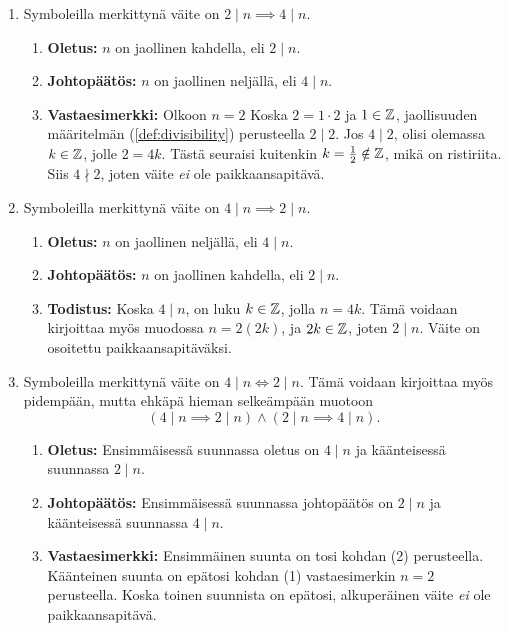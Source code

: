 \documentclass[12pt,a4paper]{article}
\begin{document}
\begin{solution}
  \leavevmode\par
  \begin{enumerate}[label=(\arabic*), nosep]
    \item Symboleilla merkittynä väite on \(2 \mid n \implies 4 \mid n\).
    \begin{enumerate}[label=\alph*), nosep]
      \item \textbf{Oletus:} \(n\) on jaollinen kahdella, eli \(2 \mid n\).
      \item \textbf{Johtopäätös:} \(n\) on jaollinen neljällä, eli \(4 \mid n\).
      \item \textbf{Vastaesimerkki:} Olkoon \(n = 2\) Koska \(2 = 1\cdot 2\) ja
        \(1 \in \mathbb{Z}\), jaollisuuden määritelmän (\ref{def:divisibility})
        perusteella \(2 \mid 2\). Jos \(4 \mid 2\), olisi olemassa
        \(k \in \mathbb{Z}\), jolle \(2 = 4k\). Tästä seuraisi kuitenkin
        \(k = \frac{1}{2} \notin \mathbb{Z}\), mikä on ristiriita. Siis \(4 \nmid 2\),
        joten väite \emph{ei} ole paikkaansapitävä.
    \end{enumerate}
  \item Symboleilla merkittynä väite on \(4 \mid n \implies 2 \mid n\).
  \begin{enumerate}[label=\alph*), nosep]
    \item \textbf{Oletus:} \(n\) on jaollinen neljällä, eli \(4 \mid n\).
    \item \textbf{Johtopäätös:} \(n\) on jaollinen kahdella, eli \(2 \mid n\).
    \item \textbf{Todistus:} Koska \(4 \mid n\), on luku \(k \in \mathbb{Z}\), jolla
      \(n = 4k\). Tämä voidaan kirjoittaa myös muodossa \(n = 2(2k)\),
      ja \(2k \in \mathbb{Z}\), joten \(2 \mid n\). Väite on osoitettu
      paikkaansapitäväksi.
  \end{enumerate}
\item Symboleilla merkittynä väite on \(4 \mid n \iff 2 \mid n\).
  Tämä voidaan kirjoittaa myös pidempään, mutta ehkäpä hieman selkeämpään
  muotoon \[(4 \mid n \implies 2 \mid n) \wedge (2 \mid n \implies 4 \mid n).\]
\begin{enumerate}[label=\alph*), nosep]
  \item \textbf{Oletus:} Ensimmäisessä suunnassa oletus on \(4 \mid n\) ja
    käänteisessä suunnassa \(2 \mid n\).
  \item \textbf{Johtopäätös:} Ensimmäisessä suunnassa johtopäätös on
    \(2 \mid n\) ja käänteisessä suunnassa \(4 \mid n\).
  \item \textbf{Vastaesimerkki:} Ensimmäinen suunta on tosi kohdan
    (2) perusteella. Käänteinen suunta on epätosi kohdan (1) vastaesimerkin
    \(n = 2\) perusteella. Koska toinen suunnista on epätosi, alkuperäinen
    väite \emph{ei} ole paikkaansapitävä.
\end{enumerate}
\end{enumerate}
\end{solution}
\end{document}
